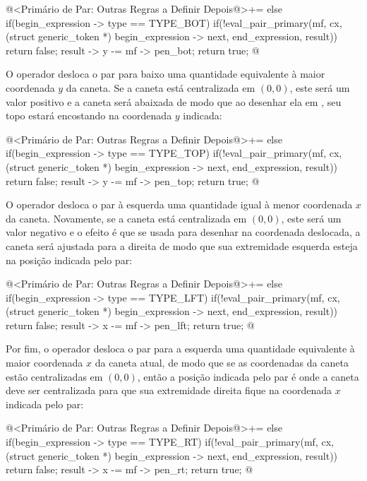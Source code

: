 {\iniciocodigo
@<Primário de Par: Outras Regras a Definir Depois@>+=
else if(begin_expression -> type == TYPE_BOT){
  if(!eval_pair_primary(mf, cx, (struct generic_token *)
                                begin_expression -> next,
                        end_expression, result))
    return false;
  result -> y -= mf -> pen_bot;
  return true;
}
@
\fimcodigo

O operador  desloca o par para baixo uma quantidade
equivalente à maior coordenada $y$ da caneta. Se a caneta está
centralizada em $(0, 0)$, este será um valor positivo e a caneta será
abaixada de modo que ao desenhar ela em , seu
topo estará encostando na coordenada $y$ indicada:

\iniciocodigo
@<Primário de Par: Outras Regras a Definir Depois@>+=
else if(begin_expression -> type == TYPE_TOP){
  if(!eval_pair_primary(mf, cx, (struct generic_token *)
                                begin_expression -> next,
                        end_expression, result))
    return false;
  result -> y -= mf -> pen_top;
  return true;
}
@
\fimcodigo


O operador  desloca o par à esquerda uma quantidade
igual à menor coordenada $x$ da caneta. Novamente, se a caneta está
centralizada em $(0, 0)$, este será um valor negativo e o efeito é que
se usada para desenhar na coordenada deslocada, a caneta será ajustada
para a direita de modo que sua extremidade esquerda esteja na posição
indicada pelo par:

\iniciocodigo
@<Primário de Par: Outras Regras a Definir Depois@>+=
else if(begin_expression -> type == TYPE_LFT){
  if(!eval_pair_primary(mf, cx, (struct generic_token *)
                                begin_expression -> next,
                        end_expression, result))
    return false;
  result -> x -= mf -> pen_lft;
  return true;
}
@
\fimcodigo

Por fim, o operador  desloca o par para a esquerda uma
quantidade equivalente à maior coordenada $x$ da caneta atual, de modo
que se as coordenadas da caneta estão centralizadas em $(0, 0)$, então
a posição indicada pelo par é onde a caneta deve ser centralizada para
que sua extremidade direita fique na coordenada $x$ indicada pelo par:

\iniciocodigo
@<Primário de Par: Outras Regras a Definir Depois@>+=
else if(begin_expression -> type == TYPE_RT){
  if(!eval_pair_primary(mf, cx, (struct generic_token *)
                                begin_expression -> next,
                        end_expression, result))
    return false;
  result -> x -= mf -> pen_rt;
  return true;
}
@
\fimcodigo

}
